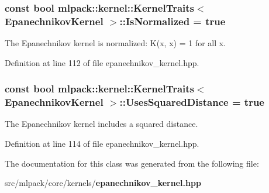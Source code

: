 \subsubsection[{Is\+Normalized}]{\setlength{\rightskip}{0pt plus 5cm}const bool {\bf mlpack\+::kernel\+::\+Kernel\+Traits}$<$ {\bf Epanechnikov\+Kernel} $>$\+::Is\+Normalized = true\hspace{0.3cm}{\ttfamily [static]}}\label{classmlpack_1_1kernel_1_1KernelTraits_3_01EpanechnikovKernel_01_4_afc1cd6ad76e8ece656410968349a61b6}


The Epanechnikov kernel is normalized\+: K(x, x) = 1 for all x. 



Definition at line 112 of file epanechnikov\+\_\+kernel.\+hpp.

\subsubsection[{Uses\+Squared\+Distance}]{\setlength{\rightskip}{0pt plus 5cm}const bool {\bf mlpack\+::kernel\+::\+Kernel\+Traits}$<$ {\bf Epanechnikov\+Kernel} $>$\+::Uses\+Squared\+Distance = true\hspace{0.3cm}{\ttfamily [static]}}\label{classmlpack_1_1kernel_1_1KernelTraits_3_01EpanechnikovKernel_01_4_a8e888d8cff9016e75bb346b02cdc10f7}


The Epanechnikov kernel includes a squared distance. 



Definition at line 114 of file epanechnikov\+\_\+kernel.\+hpp.



The documentation for this class was generated from the following file\+:\begin{DoxyCompactItemize}
\item 
src/mlpack/core/kernels/{\bf epanechnikov\+\_\+kernel.\+hpp}\end{DoxyCompactItemize}
